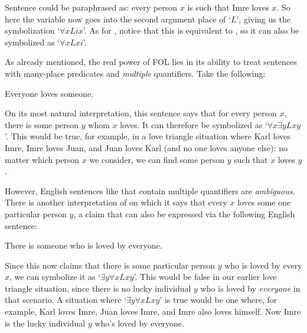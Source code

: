 Sentence  could be paraphrased as: every person $x$ is such that Imre loves $x$.  So here the variable now goes into the second argument place of `$L$', giving us the symbolization `$\forall xLix$'.  As for , notice that this is equivalent to , so it can also be symbolized as `$\forall xLxi$'.

As already mentioned, the real power of FOL lies in its ability to treat sentences with many-place predicates and \emph{multiple} quantifiers.  Take the following:
	\begin{earg}
		\item[\ex{elovs}] Everyone loves someone.
	\end{earg}
On its most natural interpretation, this sentence says that for every person $x$, there is some person $y$ whom $x$ loves. It can therefore be symbolized as `$\forall x \exists yLxy$'.  This would be true, for example, in a love triangle situation where Karl loves Imre, Imre loves Juan, and Juan loves Karl (and no one loves anyone else): no matter which person  $x$ we consider, we can find some person $y$ such that $x$ loves $y$.

However, English sentences like  that contain multiple quantifiers are \emph{ambiguous}.  There is another interpretation of  on which it says that every $x$ loves some one particular person $y$, a claim that can also be expressed via the following English sentence:
	\begin{earg}
		\item[\ex{slovbye}] There is someone who is loved by everyone.
	\end{earg}
Since this now claims that there is some particular person $y$ who is loved by every $x$, we can symbolize it as `$\exists y\forall xLxy$'.  This would be false in our earlier love triangle situation, since there is no lucky individual $y$ who is loved by \emph{everyone} in that scenario.  A situation where `$\exists y\forall xLxy$' is true would be one where, for example, Karl loves Imre, Juan loves Imre, and Imre also loves himself.  Now Imre is the lucky individual $y$ who's loved by everyone.

